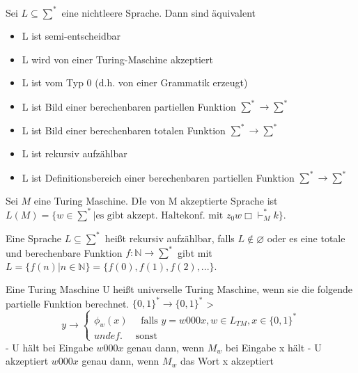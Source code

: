 \documentclass[avery5371]{flashcards}
\begin{document}
\begin{flashcard}[Satz]{Sei $L\subseteq \sum^*$ eine nichtleere Sprache. Dann sind äquivalent}\begin{itemize}
\item L ist semi-entscheidbar
\item L wird von einer Turing-Maschine akzeptiert
\item L ist vom Typ 0 (d.h. von einer Grammatik erzeugt)
\item L ist Bild einer berechenbaren partiellen Funktion $\sum^*\rightarrow\sum^*$
\item L ist Bild einer berechenbaren totalen Funktion $\sum^*\rightarrow\sum^*$
\item L ist rekursiv aufzählbar
\item L ist Definitionsbereich einer berechenbaren partiellen Funktion $\sum^*\rightarrow\sum^*$
    \end{itemize}
\end{flashcard}

\begin{flashcard}[Definition]{} Sei $M$ eine Turing Maschine. DIe von M akzeptierte Sprache ist $L(M)=\{ w\in\sum^* | \text{es gibt akzept. Haltekonf. mit } z_0w\Box\vdash_M^* k\}$.
\end{flashcard}

\begin{flashcard}[Definition]{} Eine Sprache $L\subseteq \sum^*$ heißt rekursiv aufzählbar, falls $L\not\in\varnothing$ oder es eine totale und berechenbare Funktion $f:\mathbb{N}\rightarrow\sum^*$ gibt mit $L=\{f(n)| n\in\mathbb{N}\}=\{f(0), f(1),f(2),...\}$.
\end{flashcard}


\begin{flashcard}[Definition]{} Eine Turing Maschine U heißt universelle Turing Maschine, wenn sie die folgende partielle Funktion berechnet. $\{0,1\}^*\rightarrow\{0,1\}^*$
> $$y\rightarrow\begin{cases} \phi_w(x) \quad\text{ falls } y=w000x,w\in L_{TM},x\in\{0,1\}^* \\ undef. \quad\text{ sonst}\end{cases}$$
- U hält bei Eingabe $w000x$ genau dann, wenn $M_w$ bei Eingabe x hält
- U akzeptiert $w000x$ genau dann, wenn $M_w$ das Wort x akzeptiert
\end{flashcard}
\end{document}
